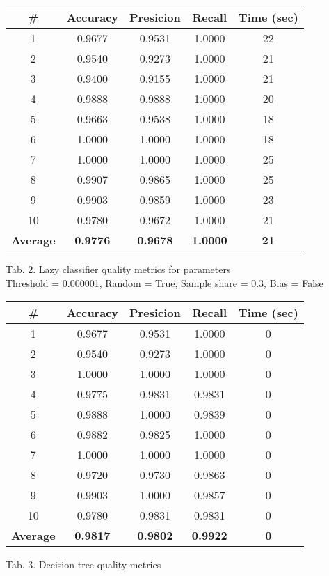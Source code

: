 \documentclass{article}
\begin{document}
\begin{center}
    \begin{tabular}{|c|c|c|c|c|}
        \hline
        \# & \textbf{Accuracy} & \textbf{Presicion} & \textbf{Recall} & \textbf{Time (sec)} \\
        \hline
        1 & 0.9677 & 0.9531 & 1.0000 & 22 \\
        2 & 0.9540 & 0.9273 & 1.0000 & 21 \\
        3 & 0.9400 & 0.9155 & 1.0000 & 21 \\
        4 & 0.9888 & 0.9888 & 1.0000 & 20 \\
        5 & 0.9663 & 0.9538 & 1.0000 & 18 \\
        6 & 1.0000 & 1.0000 & 1.0000 & 18 \\
        7 & 1.0000 & 1.0000 & 1.0000 & 25 \\
        8 & 0.9907 & 0.9865 & 1.0000 & 25 \\
        9 & 0.9903 & 0.9859 & 1.0000 & 23 \\
        10 & 0.9780 & 0.9672 & 1.0000 & 21 \\
        \hline
        \textbf{Average} & \textbf{0.9776} & \textbf{0.9678} & \textbf{1.0000} & \textbf{21} \\
        \hline
    \end{tabular}
    
    Tab. 2. Lazy classifier quality metrics for parameters \\Threshold = 0.000001, Random = True, Sample share = 0.3, Bias = False
\end{center}

\begin{center}
    \begin{tabular}{|c|c|c|c|c|}
        \hline
        \# & \textbf{Accuracy} & \textbf{Presicion} & \textbf{Recall} & \textbf{Time (sec)} \\
        \hline
        1	& 0.9677	& 0.9531	& 1.0000	& 0 \\
        2	& 0.9540	& 0.9273	& 1.0000	& 0 \\
        3	& 1.0000	& 1.0000	& 1.0000	& 0 \\
        4	& 0.9775	& 0.9831	& 0.9831	& 0 \\
        5	& 0.9888	& 1.0000	& 0.9839	& 0 \\
        6	& 0.9882	& 0.9825	& 1.0000	& 0 \\
        7	& 1.0000	& 1.0000	& 1.0000	& 0 \\
        8	& 0.9720	& 0.9730	& 0.9863	& 0 \\
        9	& 0.9903	& 1.0000	& 0.9857	& 0 \\
        10	& 0.9780	& 0.9831	& 0.9831	& 0 \\
        \hline
        \textbf{Average} & \textbf{0.9817} & \textbf{0.9802} & \textbf{0.9922} & \textbf{0} \\
        \hline
    \end{tabular}
    
    Tab. 3. Decision tree quality metrics
\end{center}
\end{document}
